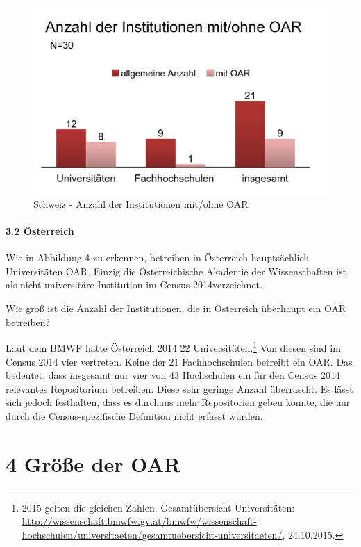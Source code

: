 \documentclass[a4paper,
fontsize=11pt,
oneside,
numbers=noperiodatend,
parskip=half-,
bibliography=totoc,
final
]{scrartcl}
\begin{document}
\begin{figure}[htbp]
\centering
\includegraphics{img/abb3_institutionen_ch_oar.jpg}
\caption{Schweiz - Anzahl der Institutionen mit/ohne OAR}
\end{figure}

\paragraph{3.2 Österreich}\label{uxf6sterreich-1}

Wie in Abbildung 4 zu erkennen, betreiben in Österreich hauptsächlich
Universitäten OAR. Einzig die Österreichische Akademie der
Wissenschaften ist als nicht-universitäre Institution im Census
2014verzeichnet.

Wie groß ist die Anzahl der Institutionen, die in Österreich überhaupt
ein OAR betreiben?

Laut dem BMWF hatte Österreich 2014 22 Universitäten.\footnote{2015
  gelten die gleichen Zahlen. Gesamtübersicht Universitäten:
  \url{http://wissenschaft.bmwfw.gv.at/bmwfw/wissenschaft-hochschulen/universitaeten/gesamtuebersicht-universitaeten/},
  24.10.2015.} Von diesen sind im Census 2014 vier vertreten. Keine der
21 Fachhochschulen betreibt ein OAR. Das bedeutet, dass insgesamt nur
vier von 43 Hochschulen ein für den Census 2014 relevantes Repositorium
betreiben. Diese sehr geringe Anzahl überrascht. Es lässt sich jedoch
festhalten, dass es durchaus mehr Repositorien geben könnte, die nur
durch die Census-spezifische Definition nicht erfasst wurden.

\section*{4 Größe der OAR}\label{gruxf6uxdfe-der-oar}
\end{document}
